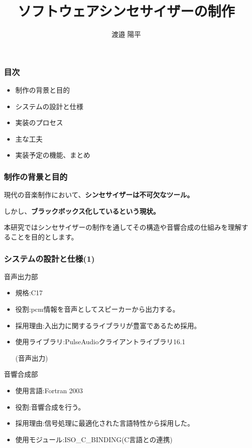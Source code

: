 \documentclass[dvipdfmx]{beamer} %
\title{ソフトウェアシンセサイザーの制作}
\author{渡邉 陽平}
\begin{document}
\begin{frame}
  \maketitle
\end{frame}

\begin{frame}
  \frametitle{目次}
  \begin{itemize}
  \item 制作の背景と目的
  \item システムの設計と仕様
  \item 実装のプロセス
  \item 主な工夫
  \item 実装予定の機能、まとめ
  \end{itemize}
\end{frame}

\begin{frame}
  \frametitle{制作の背景と目的}
  現代の音楽制作において、\textbf{\Large シンセサイザーは不可欠なツール。}\par
  しかし、\textbf{\LARGE ブラックボックス化しているという現状。}\par
  \vspace{0.5cm}
  本研究ではシンセサイザーの制作を通してその構造や音響合成の仕組みを理解することを目的とします。\par
\end{frame}

\begin{frame}
  \frametitle{システムの設計と仕様(1)}
  \alert{\large 音声出力部}
  \begin{itemize}
  \item 規格:C17
  \item 役割:pcm情報を音声としてスピーカーから出力する。
  \item 採用理由:入出力に関するライブラリが豊富であるため採用。
  \item 使用ライブラリ:PulseAudioクライアントライブラリ16.1\par(音声出力)
  \end{itemize}
\vspace{0.5cm}
  \alert{\large 音響合成部}
  \begin{itemize}
  \item 使用言語:Fortran 2003
  \item 役割:音響合成を行う。
  \item 採用理由:信号処理に最適化された言語特性から採用した。
  \item 使用モジュール:ISO\_C\_BINDING(C言語との連携)
  \end{itemize}
\end{frame}    
\end{document}
